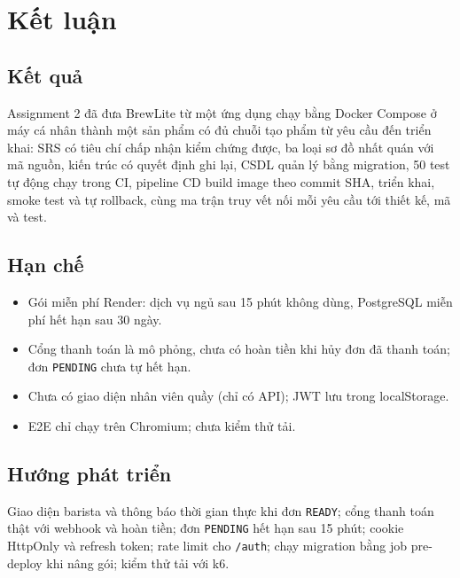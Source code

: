 \documentclass[a4paper]{article}
\newcommand{\st}[1]{\texttt{#1}}
\begin{document}
\section{Kết luận}
\subsection{Kết quả}
Assignment 2 đã đưa BrewLite từ một ứng dụng chạy bằng Docker Compose ở máy cá nhân thành một sản phẩm có đủ chuỗi tạo phẩm từ yêu cầu đến triển khai: SRS có tiêu chí chấp nhận kiểm chứng được, ba loại sơ đồ nhất quán với mã nguồn, kiến trúc có quyết định ghi lại, CSDL quản lý bằng migration, 50 test tự động chạy trong CI, pipeline CD build image theo commit SHA, triển khai, smoke test và tự rollback, cùng ma trận truy vết nối mỗi yêu cầu tới thiết kế, mã và test.

\subsection{Hạn chế}
\begin{itemize}
  \item Gói miễn phí Render: dịch vụ ngủ sau 15 phút không dùng, PostgreSQL miễn phí hết hạn sau 30 ngày.
  \item Cổng thanh toán là mô phỏng, chưa có hoàn tiền khi hủy đơn đã thanh toán; đơn \st{PENDING} chưa tự hết hạn.
  \item Chưa có giao diện nhân viên quầy (chỉ có API); JWT lưu trong localStorage.
  \item E2E chỉ chạy trên Chromium; chưa kiểm thử tải.
\end{itemize}

\subsection{Hướng phát triển}
Giao diện barista và thông báo thời gian thực khi đơn \st{READY}; cổng thanh toán thật với webhook và hoàn tiền; đơn \st{PENDING} hết hạn sau 15 phút; cookie HttpOnly và refresh token; rate limit cho \st{/auth}; chạy migration bằng job pre-deploy khi nâng gói; kiểm thử tải với k6.

\appendix
\end{document}
